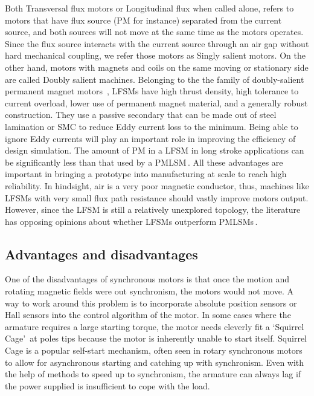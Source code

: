         
        Both Transversal flux motors or Longitudinal flux when called alone, refers to motors that have flux source (\acs{PM} for instance) separated from the current source, and both sources will not move at the same time as the motors operates. Since the flux source interacts with the current source through an air gap without hard mechanical coupling, we refer those motors as Singly salient motors. On the other hand, motors with magnets and coils on the same moving or stationary side are called Doubly salient machines. Belonging  to  the  the  family of doubly-salient permanent magnet motors \,\cite{Cheng2011}, \acp{LFSM} have high  thrust  density, high  tolerance  to  current  overload, lower use  of  permanent  magnet  material,  and  a generally robust construction. They use a passive secondary that can be made out of steel lamination or \ac{SMC} to reduce Eddy current loss  to the minimum. Being  able  to ignore Eddy currents will play an important role in improving the efficiency of design simulation. The amount of \acs{PM} in a \acs{LFSM} in long stroke applications can be significantly less than that used by a \acs{PMLSM}\,\cite{Aleksandrov2018DesignTracks}. All these advantages are important in bringing a  prototype into manufacturing at scale to reach high reliability. In hindsight, air is a very poor magnetic conductor, thus, machines like \acsp{LFSM} with very small flux path resistance should vastly improve motors output. However, since the \acs{LFSM} is still a relatively unexplored topology, the literature has opposing opinions about whether \acsp{LFSM} outperform \acsp{PMLSM}\,\cite{Aleksandrov2018DesignTracks,Wang2008ComparativeSuspension}.
    
    
    \subsection{Advantages and disadvantages}   \label{Chapter:background/linear synchronous motors for NFJI/advantages and disadvantages}
        
        
        One of the disadvantages of synchronous motors is that once the motion and rotating magnetic fields were out synchronism, the motors would not move. A way to work around this problem is to incorporate absolute position sensors or Hall sensors into the control algorithm of the motor. In some cases where the armature requires a large starting torque, the motor needs cleverly fit a ‘Squirrel Cage’\,\cite{Marcic2008} at poles tips because the motor is inherently unable to start itself. Squirrel Cage is a popular self-start mechanism, often seen in rotary synchronous motors to allow for asynchronous starting and catching up with synchronism. Even with the help of methods to speed up to synchronism, the armature can always lag if the power supplied is insufficient to cope with the load.
        
